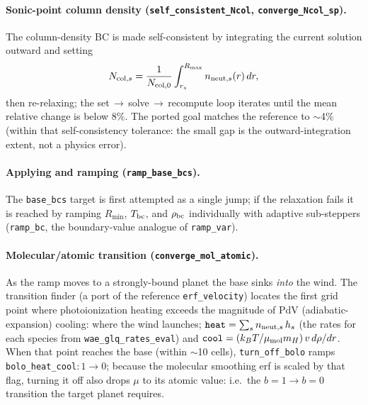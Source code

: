 \documentclass[english,a4paper]{my_memo}
\newcommand{\code}[1]{\texttt{#1}}
\begin{document}
\paragraph{Sonic-point column density (\code{self\_consistent\_Ncol},
\code{converge\_Ncol\_sp}).} The column-density BC is made self-consistent
by integrating the current solution outward and setting
\[
N_{{\rm col},s} = \frac{1}{N_{\rm col,0}}\int_{r_s}^{R_{\max}}
   n_{{\rm neut},s}(r)\,dr,
\]
then re-relaxing; the set\,$\to$\,solve\,$\to$\,recompute loop iterates
until the mean relative change is below $8\%$. The ported goal matches the
reference to $\sim$4\% (within that self-consistency tolerance: the
small gap is the outward-integration extent, not a physics error).

\paragraph{Applying and ramping (\code{ramp\_base\_bcs}).} The
\code{base\_bcs} target is first attempted as a single jump; if the
relaxation fails it is reached by ramping $R_{\min}$, $T_{\rm bc}$, and
$\rho_{\rm bc}$ individually with adaptive sub-steppers (\code{ramp\_bc},
the boundary-value analogue of \code{ramp\_var}).

\paragraph{Molecular/atomic transition (\code{converge\_mol\_atomic}).} As
the ramp moves to a strongly-bound planet the base sinks \emph{into} the
wind. The transition finder (a port of the reference \code{erf\_velocity})
locates the first grid point where photoionization heating exceeds the
magnitude of PdV (adiabatic-expansion) cooling: where the wind launches;
$\code{heat}=\sum_s n_{{\rm neut},s}\,h_s$ (the rates for each species from
\code{wae\_glq\_rates\_eval}) and
$\code{cool}=(k_B T/\mu_{\rm mol}m_H)\,v\,d\rho/dr$. When that point reaches
the base (within $\sim$10 cells), \code{turn\_off\_bolo} ramps
\code{bolo\_heat\_cool}$:1\to0$; because the molecular smoothing erf is
scaled by that flag, turning it off also drops $\mu$ to its atomic value:
i.e.\ the $b=1\to b=0$ transition the target planet requires.
\end{document}
